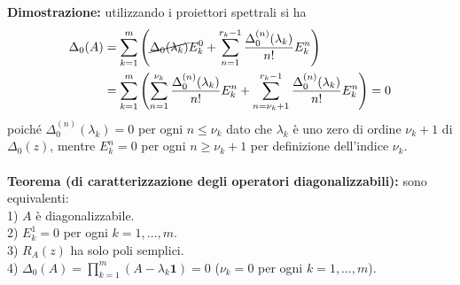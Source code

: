 \documentclass{article}
\begin{document}
\textbf{Dimostrazione:} utilizzando i proiettori spettrali si ha
\begin{align}
    \Delta_0(A) &= \sum_{k = 1}^m\left(\cancel{\Delta_0(\lambda_k)}E_k^0 + \sum_{n = 1}^{r_k - 1}\frac{\Delta^{(n)}_0(\lambda_k)}{n!}E_k^n\right) \notag \\
    &= \sum_{k = 1}^m\left(\sum_{n = 1}^{\nu_k}\frac{\Delta^{(n)}_0(\lambda_k)}{n!}E_k^n + \sum_{n = \nu_k + 1}^{r_k - 1}\frac{\Delta^{(n)}_0(\lambda_k)}{n!}E_k^n\right) = 0 \notag
\end{align}
poiché $\Delta^{(n)}_0(\lambda_k) = 0$ per ogni $n \leq \nu_k$ dato che $\lambda_k$ è uno zero di ordine $\nu_k + 1$ di $\Delta_0(z)$, mentre $E_k^n = 0$ per ogni $n \geq \nu_k + 1$ per definizione dell'indice $\nu_k$. \\ \\
\textbf{Teorema (di caratterizzazione degli operatori diagonalizzabili):} sono equivalenti: \\
1) $A$ è diagonalizzabile. \\
2) $E_k^1 = 0$ per ogni $k = 1, \dots, m$. \\
3) $R_A(z)$ ha solo poli semplici. \\
4) $\Delta_0(A) = \prod_{k = 1}^m (A - \lambda_k\mathbf{1}) = 0$ ($\nu_k = 0$ per ogni $k = 1, \dots, m$). \\
\end{document}
